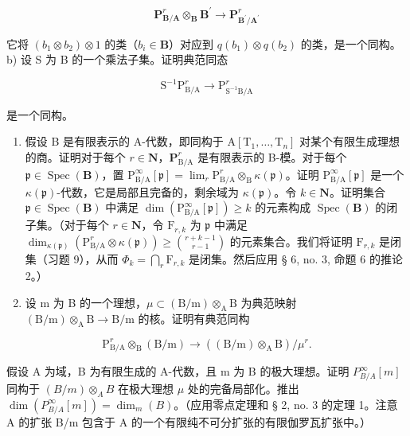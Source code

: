 \[
\mathbf {P} _ {\mathbf {B} / \mathbf {A}} ^ {r} \otimes_ {\mathbf {B}} \mathbf {B} ^ {\prime} \rightarrow \mathbf {P} _ {\mathbf {B} ^ {\prime} / \mathbf {A} ^ {\prime}} ^ {r}
\]

它将 \((b_{1} \otimes b_{2}) \otimes 1\) 的类（\(b_{i} \in \mathbf{B}\)）对应到 \(q(b_{1}) \otimes q(b_{2})\) 的类，是一个同构。b) 设 S 为 B 的一个乘法子集。证明典范同态

\[
\mathrm{S} ^ {- 1} \mathrm{P} _ {\mathrm{B/A}} ^ {r} \rightarrow \mathrm{P} _ {\mathrm{S} ^ {- 1} \mathrm{B/A}} ^ {r}
\]

是一个同构。

\begin{enumerate}
\def\labelenumi{\alph{enumi})}
\setcounter{enumi}{2}
\item
  假设 B 是有限表示的 A-代数，即同构于 \(\mathrm{A}[\mathrm{T}_{1},\ldots,\mathrm{T}_{n}]\) 对某个有限生成理想的商。证明对于每个 \(r\in\mathbf{N}\)，\(\mathbf{P}_{\mathrm{B}/\mathrm{A}}^{r}\) 是有限表示的 B-模。对于每个 \(\mathfrak{p}\in\operatorname{Spec}(\mathbf{B})\)，置 \(\mathrm{P}_{\mathrm{B}/\mathrm{A}}^{\infty}[\mathfrak{p}]=\lim_{r}\mathrm{P}_{\mathrm{B}/\mathrm{A}}^{r}\otimes_{\mathrm{B}}\kappa(\mathfrak{p})\)。证明 \(\mathrm{P}_{\mathrm{B}/\mathrm{A}}^{\infty}[\mathfrak{p}]\) 是一个 \(\kappa(\mathfrak{p})\)-代数，它是局部且完备的，剩余域为 \(\kappa(\mathfrak{p})\)。令 \(k\in\mathbf{N}\)。证明集合 \(\mathfrak{p}\in\operatorname{Spec}(\mathbf{B})\) 中满足 \(\dim(\mathrm{P}_{\mathrm{B}/\mathrm{A}}^{\infty}[\mathfrak{p}])\geqslant k\) 的元素构成 \(\operatorname{Spec}(\mathbf{B})\) 的闭子集。（对于每个 \(r\in\mathbf{N}\)，令 \(\mathrm{F}_{r,k}\) 为 \(\mathfrak{p}\) 中满足 \(\dim_{\kappa(\mathfrak{p})}(\mathrm{P}_{\mathrm{B}/\mathrm{A}}^{r}\otimes\kappa(\mathfrak{p}))\geqslant\binom{r+k-1}{r-1}\) 的元素集合。我们将证明 \(\mathrm{F}_{r,k}\) 是闭集（习题 9），从而 \(\Phi_{k}=\bigcap_{r}\mathrm{F}_{r,k}\) 是闭集。然后应用 § 6, no. 3, 命题 6 的推论 2。）
\item
  设 m 为 B 的一个理想，\(\mu\subset(\mathrm{B/m})\otimes_{\mathrm{A}}\mathrm{B}\) 为典范映射 \((\mathrm{B/m})\otimes_{\mathrm{A}}\mathrm{B}\to\mathrm{B/m}\) 的核。证明有典范同构
\end{enumerate}

\[
\mathrm{P} _ {\mathrm{B/A}} ^ {r} \otimes_ {\mathrm{B}} (\mathrm{B/m}) \rightarrow ((\mathrm{B/m}) \otimes_ {\mathrm{A}} \mathrm{B}) / \mu^ {r}.
\]

假设 A 为域，B 为有限生成的 A-代数，且 m 为 B 的极大理想。证明 \(P_{B/A}^{\infty}[m]\) 同构于 \((B/m)\otimes_{A}B\) 在极大理想 \(\mu\) 处的完备局部化。推出 \(\dim(P_{B/A}^{\infty}[m])=\dim_{m}(B)\)。（应用零点定理和 § 2, no. 3 的定理 1。注意 A 的扩张 B/m 包含于 A 的一个有限纯不可分扩张的有限伽罗瓦扩张中。）

